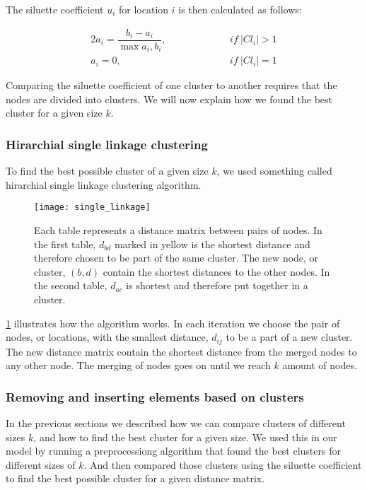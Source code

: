 \documentclass[../main.tex]{subfiles}
\begin{document}
The siluette coefficient $u_i$ for location $i$ is then calculated as follows: 

\begin{alignat} {2}
    \label{eq:siluette}
    a_i = \dfrac{b_i-a_i}{\max{a_i,b_i}}, &\quad\quad\quad\quad&& if\ |Cl_i|>1 \label{eq:siluette}\\
    a_i = 0,& && if\ |Cl_i| = 1 \nonumber
\end{alignat}

Comparing the siluette coefficient of one cluster to another requires that the nodes are divided into clusters. We will now explain how we found the best cluster for a given size $k$.

\subsubsection{Hirarchial single linkage clustering}
To find the best possible cluster of a given size $k$, we used something called hirarchial single linkage clustering algorithm.

\begin{figure}                                                                                     
    \centering                                                                                 
    \texttt{[image: single\_linkage]}                                     
    \caption{Each table represents a distance matrix between pairs of nodes. In the first table, $d_{bd}$ marked in yellow is the shortest distance and therefore chosen to be part of the same cluster. The new node, or cluster, $(b,d)$ contain the shortest distances to the other nodes. In the second table, $d_{ac}$ is shortest and therefore put together in a cluster.}
    \label{fig:hierarch}
\end{figure}

\cref{fig:hierarch} illustrates how the algorithm works. 
In each iteration we choose the pair of nodes, or locations, with the smallest distance, $d_{ij}$ to be a part of a new cluster. The new distance matrix contain the shortest distance from the merged nodes to any other node. The merging of nodes goes on until we reach $k$ amount of nodes.

\subsubsection{Removing and inserting elements based on clusters}
In the previous sections we described how we can compare clusters of different sizes $k$, and how to find the best cluster for a given size. We used this in our model by running a preprocessiong algorithm that found the best clusters for different sizes of $k$. And then compared those clusters using the siluette coefficient to find the best possible cluster for a given distance matrix. \par
\end{document}
